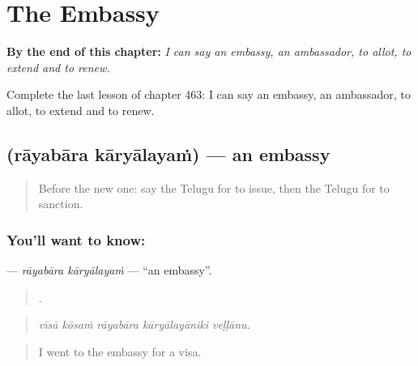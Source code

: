 
\chapter{The Embassy}
\label{ch:te-the-embassy}

\begin{chapteropening}
\textbf{By the end of this chapter:} \emph{I can say an embassy, an ambassador, to allot, to extend and to renew.}

Complete the last lesson of chapter 463: I can say an embassy, an ambassador, to allot, to extend and to renew.
\end{chapteropening}

\section[\texorpdfstring{\te{రాయబార} \te{కార్యాలయం} (rāyabāra kāryālayaṁ)}{రాయబార కార్యాలయం (rāyabāra kāryālayaṁ)}]{  (rāyabāra kāryālayaṁ) — an embassy}

\label{lesson:TE-C463-rayabara-karyalayam}



\begin{quote}
Before the new one: say the Telugu for to issue, then the Telugu for to sanction.
\end{quote}

\subsection*{You'll want to know:  }
\textbf{ } — \emph{rāyabāra kāryālayaṁ} — \textquotedblleft{}an embassy\textquotedblright{}.

\begin{quote}
    .
\end{quote}

\begin{quote}
\emph{vīsā kōsaṁ rāyabāra kāryālayāniki veḷḷānu.}
\end{quote}

\begin{quote}
I went to the embassy for a visa.
\end{quote}


